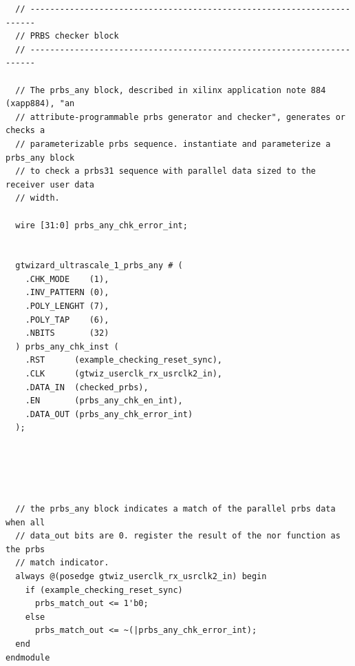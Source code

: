 \documentclass[oneside]{discothesis}
\begin{document}
\begin{verbatim}
  // -----------------------------------------------------------------------
  // PRBS checker block
  // -----------------------------------------------------------------------

  // The prbs_any block, described in xilinx application note 884 (xapp884), "an
  // attribute-programmable prbs generator and checker", generates or checks a
  // parameterizable prbs sequence. instantiate and parameterize a prbs_any block
  // to check a prbs31 sequence with parallel data sized to the receiver user data
  // width.

  wire [31:0] prbs_any_chk_error_int;


  gtwizard_ultrascale_1_prbs_any # (
    .CHK_MODE    (1),
    .INV_PATTERN (0),
    .POLY_LENGHT (7),
    .POLY_TAP    (6),
    .NBITS       (32)
  ) prbs_any_chk_inst (
    .RST      (example_checking_reset_sync),
    .CLK      (gtwiz_userclk_rx_usrclk2_in),
    .DATA_IN  (checked_prbs),
    .EN       (prbs_any_chk_en_int),
    .DATA_OUT (prbs_any_chk_error_int)
  );





  // the prbs_any block indicates a match of the parallel prbs data when all
  // data_out bits are 0. register the result of the nor function as the prbs
  // match indicator.
  always @(posedge gtwiz_userclk_rx_usrclk2_in) begin
    if (example_checking_reset_sync)
      prbs_match_out <= 1'b0;
    else
      prbs_match_out <= ~(|prbs_any_chk_error_int);
  end
endmodule
\end{verbatim}




\cleardoublepage



\end{document}
